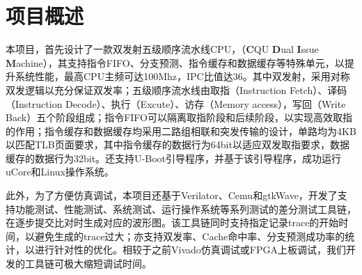 \section{项目概述}
本项目，首先设计了一款双发射五级顺序流水线CPU，\cpuname（\textbf{C}QU \textbf{D}ual \textbf{I}ssue \textbf{M}achine），其支持指令FIFO、分支预测、指令缓存和数据缓存等特殊单元，以提升系统性能，最高CPU主频可达100Mhz，IPC比值达36。其中双发射，采用对称双发逻辑以充分保证双发率；五级顺序流水线由取指（Instruction Fetch）、译码（Instruction Decode）、执行（Excute）、访存（Memory access），写回（Write Back）五个阶段组成；指令FIFO可以隔离取指阶段和后续阶段，以实现高效取指的作用；指令缓存和数据缓存均采用二路组相联和突发传输的设计，单路均为4KB以匹配TLB页面要求，其中指令缓存的数据行为64bit以适应双发取指要求，数据缓存的数据行为32bit。\cpuname 还支持U-Boot引导程序，并基于该引导程序，成功运行uCore和Linux操作系统。

此外，为了方便仿真调试，本项目还基于Verilator、Cemu和gtkWave，开发了支持功能测试、性能测试、系统测试、运行操作系统等系列测试的差分测试工具链，在逐步提交比对时生成对应的波形图。该工具链同时支持指定记录trace的开始时间，以避免生成的trace过大；亦支持双发率、Cache命中率、分支预测成功率的统计，以进行针对性的优化。相较于之前Vivado仿真调试或FPGA上板调试，我们开发的工具链可极大缩短调试时间。